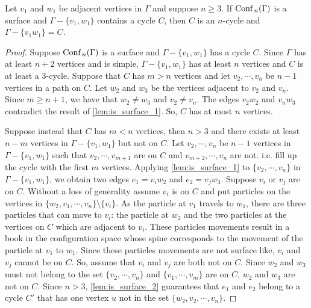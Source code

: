 \begin{lem}
\label{lem:is_surface_C}
Let \(v_1\) and \(w_1\) be adjacent vertices in \(\Gamma\) and suppose \(n \ge 3\).
If \(\text{Conf}\,_n(\Gamma)\) is a surface and \(\Gamma - \{v_1, w_1\}\) contains a cycle \(C\),
then \(C\) is an \(n\)-cycle and \(\Gamma - \{v_1 w_1\} = C\). 
\end{lem}
\begin{proof}
Suppose \(\text{Conf}\,_n(\Gamma)\) is a surface and \(\Gamma - \{v_1, w_1\}\) has a cycle \(C\).
Since \(\Gamma\) has at least \(n + 2\) vertices and is simple, 
\(\Gamma - \{v_1, w_1\}\) has at least \(n\) vertices and \(C\) is at least a \(3\)-cycle.
Suppose that \(C\) has \(m > n\) vertices and let \(v_2, \cdots, v_n\) be \(n-1\) vertices in a path on \(C\).
Let \(w_2\) and \(w_3\) be the vertices adjacent to \(v_2\) and \(v_n\).
Since \(m \ge n + 1\), we have that \(w_2 \neq w_3\) and \(v_2 \neq v_n\).
The edges \(v_2 w_2\) and \(v_n w_3\) contradict the result of \ref{lem:is_surface_1}.
So, \(C\) has at most \(n\) vertices.

Suppose instead that \(C\) has \(m < n\) vertices, then \(n > 3\) and there exists at least \(n - m\) vertices in \(\Gamma - \{v_1, w_1\}\) but not on \(C\).
Let \(v_2, \cdots, v_n\) be \(n - 1\) vertices in \(\Gamma - \{v_1, w_1\}\) such that \(v_2, \cdots, v_{m + 1}\) are on \(C\) and
\(v_{m + 2}, \cdots, v_n\) are not. i.e. fill up the cycle with the first \(m\) vertices.
Applying \ref{lem:is_surface_1} to \(\{v_2, \cdots, v_n\}\) in \(\Gamma - \{v_1, w_1\}\), we obtain two edges \(e_1 = v_i w_2\) and \(e_2 = v_j w_3\).
Suppose \(v_i\) or \(v_j\) are on \(C\). Without a loss of generality assume \(v_i\) is on \(C\) and
put particles on the vertices in \(\{w_2, v_1, \cdots, v_n\}\setminus\{v_i\}\).
As the particle at \(v_1\) travels to \(w_1\), there are three particles that can move to \(v_i\): the particle at \(w_2\) and the two
particles at the vertices on \(C\) which are adjacent to \(v_i\).
These particles movements result in a book in the configuration space whose spine corresponds to the movement of the particle at \(v_1\) to \(w_1\).
Since these particles movements are not surface like, \(v_i\) and \(v_j\) cannot be on \(C\).
So, assume that \(v_i\) and \(v_j\) are both not on \(C\).
Since \(w_2\) and \(w_3\) must not belong to the set \(\{v_2, \cdots, v_n\}\) and \(\{v_1, \cdots, v_m\}\) are on \(C\),
\(w_2\) and \(w_3\) are not on \(C\).
Since \(n > 3\), \ref{lem:is_surface_2} guarantees that \(e_1\) and \(e_2\) belong to a cycle \(C'\) that has one vertex \(u\) not in
the set \(\{w_2, v_2, \cdots, v_n\}\).


\end{proof}
